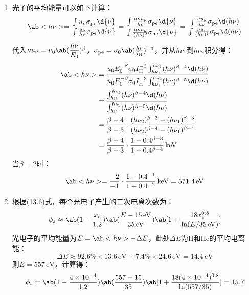 \documentclass[a4paper,fontset=none]{ctexart}
\begin{document}
\begin{enumerate}
    \medskip
    \item[30.1 (c)]
    光子的平均能量可以如下计算：
    \[
        \ab<h\nu> = \frac{\int u_\nu \sigma_{\mathrm{pe}} \d{\nu}}{\int \frac{u_\nu}{h\nu} \sigma_{\mathrm{pe}} \d{\nu}} = \frac{\int \frac{h\nu u_\nu}{h\nu} \sigma_{\mathrm{pe}} \d{\nu}}{\int \frac{h\nu u_\nu}{(h\nu)^2} \sigma_{\mathrm{pe}} \d{\nu}} = \frac{\int \frac{\nu u_\nu}{h\nu} \sigma_{\mathrm{pe}} \d(h\nu)}{\int \frac{\nu u_\nu}{(h\nu)^2} \sigma_{\mathrm{pe}} \d(h\nu)}
    \]
    代入$\nu u_\nu = u_0 \ab(\dfrac{h\nu}{E_0})^\beta$，$\sigma_{\mathrm{pe}} = \sigma_0 \ab(\frac{h\nu}{I_{\mathrm{H}}})^{-3}$，并从$h\nu_1$到$h\nu_2$积分得：
    \begin{align*}
        \ab<h\nu>
        &= \frac{u_0 E_0^{-\beta} \sigma_0 I_{\mathrm{H}}^{-3} \int_{h\nu_1}^{h\nu_2} (h\nu)^{\beta-4} \d(h\nu)}{u_0 E_0^{-\beta} \sigma_0 I_{\mathrm{H}}^{-3} \int_{h\nu_1}^{h\nu_2} (h\nu)^{\beta-5} \d(h\nu)} \\
        &= \frac{\int_{h\nu_1}^{h\nu_2} (h\nu)^{\beta-4} \d(h\nu)}{\int_{h\nu_1}^{h\nu_2} (h\nu)^{\beta-5} \d(h\nu)} \\
        &= \frac{\beta - 4}{\beta - 3} \cdot \frac{(h\nu_2)^{\beta - 3} - (h\nu_1)^{\beta - 3}}{(h\nu_2)^{\beta - 4} - (h\nu_1)^{\beta - 4}} \\
        &= \frac{\beta - 4}{\beta - 3} \cdot \frac{1 - 0.4^{\beta - 3}}{1 - 0.4^{\beta - 4}}\,\mathrm{keV} \\
    \end{align*}
    当$\beta = 2$时：
    \[
        \ab<h\nu> = \frac{-2}{-1} \cdot \frac{1 - 0.4^{-1}}{1 - 0.4^{-2}}\,\mathrm{keV} = 571.4\,\mathrm{eV}
    \]

    \medskip
    \item[30.1 (d)]
    根据(13.6)式，每个光电子产生的二次电离次数为：
    \[
        \phi_s \approx \ab(1 - \frac{x_e}{1.2}) \ab(\frac{E - 15\,\mathrm{eV}}{35\,\mathrm{eV}}) \ab[1 + \frac{18x_e^{0.8}}{\ln(E/35\,\mathrm{eV})}]
    \]
    光电子的平均能量为$E = \ab<h\nu> - \Delta E$，此处$\Delta E$为$\mathrm{H}$和$\mathrm{He}$的平均电离能：
    \[
        \Delta E \approx 92.6\% \times 13.6\,\mathrm{eV} + 7.4\% \times 24.6\,\mathrm{eV} = 14.4\,\mathrm{eV}
    \]
    则$E = 557\,\mathrm{eV}$，计算得：
    \[
        \phi_s = \ab(1 - \frac{4 \times 10^{-4}}{1.2}) \ab(\frac{557 - 15}{35}) \ab[1 + \frac{18(4 \times 10^{-4})^{0.8}}{\ln(557/35)}] = 15.7
    \]

\end{enumerate}
\end{document}

